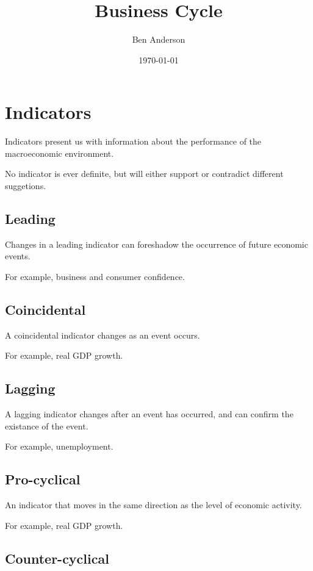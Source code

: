 \documentclass[a4paper,11pt]{article}
\begin{document}
\title{Business Cycle}
\author{Ben Anderson}
\date{\today}
\maketitle
\pagebreak

\tableofcontents
\pagebreak


\section{Indicators}

Indicators present us with information about the performance of the
macroeconomic environment.

No indicator is ever definite, but will either support or contradict different
suggetions.


\subsection{Leading}

Changes in a leading indicator can foreshadow the occurrence of future economic
events.

For example, business and consumer confidence.


\subsection{Coincidental}

A coincidental indicator changes as an event occurs.

For example, real GDP growth.


\subsection{Lagging}

A lagging indicator changes after an event has occurred, and can confirm the
existance of the event.

For example, unemployment.


\subsection{Pro-cyclical}

An indicator that moves in the same direction as the level of economic activity.

For example, real GDP growth.


\subsection{Counter-cyclical}
\end{document}
